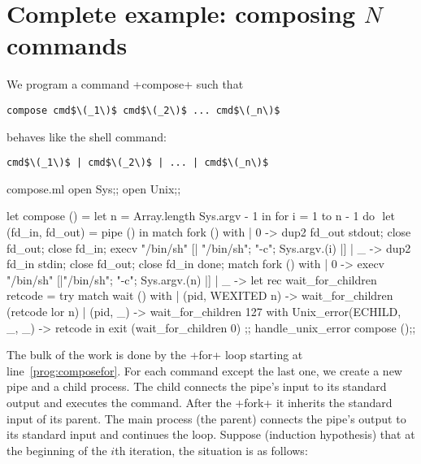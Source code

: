 \section{Complete example: composing $N$ commands}

We program a command \ml+compose+ such that 
\begin{lstlisting}
compose cmd$\(_1\)$ cmd$\(_2\)$ ... cmd$\(_n\)$ 
\end{lstlisting}
behaves like the shell command:
\begin{lstlisting}
cmd$\(_1\)$ | cmd$\(_2\)$ | ... | cmd$\(_n\)$
\end{lstlisting}
\begin{listingcodefile}[style=numbers]{compose.ml}
open Sys;;
open Unix;;

let compose () =
  let n = Array.length Sys.argv - 1 in
  for i = 1 to n - 1 do $\label{prog:composefor}$
    let (fd_in, fd_out) = pipe () in
    match fork () with
    | 0 ->
        dup2 fd_out stdout;
        close fd_out;
        close fd_in;
        execv "/bin/sh" [| "/bin/sh"; "-c"; Sys.argv.(i) |]
    | _ ->
        dup2 fd_in stdin;
        close fd_out;
        close fd_in
  done;
  match fork () with
  | 0 -> execv "/bin/sh" [|"/bin/sh"; "-c"; Sys.argv.(n) |]
  | _ ->
      let rec wait_for_children retcode =
        try
          match wait () with
          | (pid, WEXITED n) -> wait_for_children (retcode lor n)
          | (pid, _)         -> wait_for_children 127
        with
          Unix_error(ECHILD, _, _) -> retcode in
      exit (wait_for_children 0)
;;
handle_unix_error compose ();;
\end{listingcodefile}
% 
The bulk of the work is done by the \ml+for+ loop starting at
line~\ref{prog:composefor}. For each command except the last one, we
create a new pipe and a child process. The child connects the pipe's
input to its standard output and executes the command. After the
\ml+fork+ it inherits the standard input of its parent. The main
process (the parent) connects the pipe's output to its standard input
and continues the loop. Suppose (induction hypothesis) that at the
beginning of the $i$th iteration, the situation is as follows:
%
